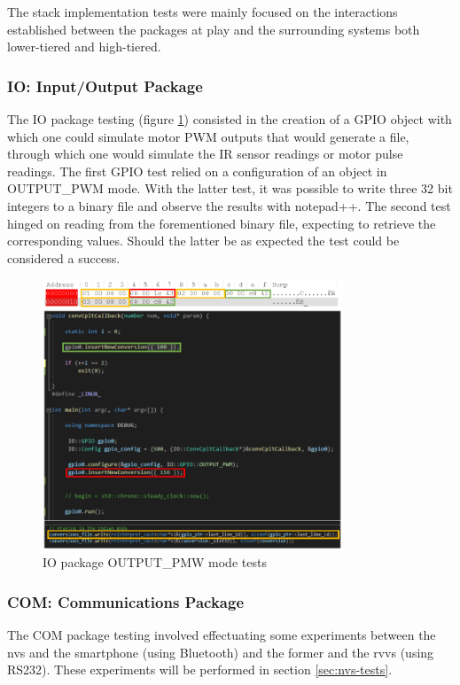 %
The stack implementation tests were mainly focused on the interactions established between the packages at play and the surrounding systems both lower-tiered and high-tiered.
%
\subsubsection{IO: Input/Output Package}
%
The IO package testing (figure \ref{fig:io-test}) consisted in the creation of a GPIO object with which one could simulate motor PWM outputs that would generate a file, through which one would simulate the IR sensor readings or motor pulse readings. The first GPIO test relied on a configuration of an object in OUTPUT\_PWM mode. With the latter test, it was possible to write three 32 bit integers to a binary file and observe the results with notepad++.
The second test hinged on reading from the forementioned binary file, expecting to retrieve the corresponding values. Should the latter be as expected the test could be considered a success.
%
\begin{figure}[!ht]
\centering
\includegraphics[width=0.8\textwidth]{img/IO-test.png}
\caption{\label{fig:io-test}IO package OUTPUT\_PMW mode tests}
\end{figure}
%
\subsubsection{COM: Communications Package}
%
The COM package testing involved effectuating some experiments between the \gls{nvs} and the smartphone (using Bluetooth) and the former and the \gls{rvvs} (using RS232). These experiments will be performed in section \ref{sec:nvs-tests}.
%
